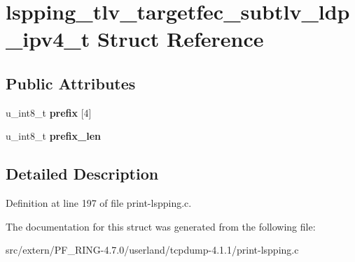 \hypertarget{structlspping__tlv__targetfec__subtlv__ldp__ipv4__t}{
\section{lspping\_\-tlv\_\-targetfec\_\-subtlv\_\-ldp\_\-ipv4\_\-t Struct Reference}
\label{structlspping__tlv__targetfec__subtlv__ldp__ipv4__t}
}
\subsection*{Public Attributes}
\begin{DoxyCompactItemize}
\item 
\hypertarget{structlspping__tlv__targetfec__subtlv__ldp__ipv4__t_a9f6fc9a7dacf122f28d5a5f71d92f434}{
u\_\-int8\_\-t {\bfseries prefix} \mbox{[}4\mbox{]}}
\label{structlspping__tlv__targetfec__subtlv__ldp__ipv4__t_a9f6fc9a7dacf122f28d5a5f71d92f434}

\item 
\hypertarget{structlspping__tlv__targetfec__subtlv__ldp__ipv4__t_a076887ba13cf09ce6b2e6bcb980737bd}{
u\_\-int8\_\-t {\bfseries prefix\_\-len}}
\label{structlspping__tlv__targetfec__subtlv__ldp__ipv4__t_a076887ba13cf09ce6b2e6bcb980737bd}

\end{DoxyCompactItemize}


\subsection{Detailed Description}


Definition at line 197 of file print-\/lspping.c.



The documentation for this struct was generated from the following file:\begin{DoxyCompactItemize}
\item 
src/extern/PF\_\-RING-\/4.7.0/userland/tcpdump-\/4.1.1/print-\/lspping.c\end{DoxyCompactItemize}
